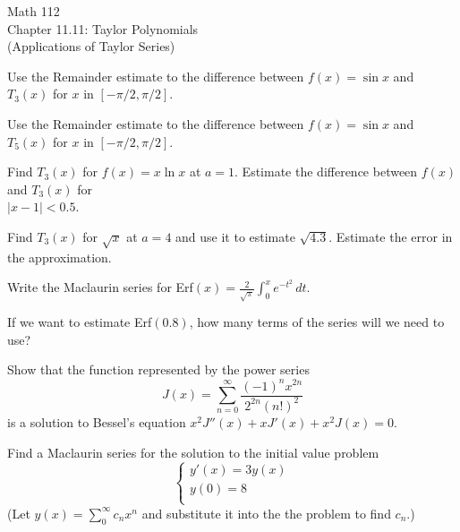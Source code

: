\documentclass[11pt]{article}
\begin{document}
\begin{center}
\Large
\rm{Math 112}
\\
\rm{Chapter 11.11:  Taylor Polynomials\\
  (Applications of Taylor Series)}
\\
\end{center}
\vspace{0.2in}

\vspace{0.2in}

Use the Remainder estimate to the difference between $f(x) = \sin{x}$ and $T_3(x)$ for $x$ in $[-\pi/2,\pi/2]$.

\vspace{2.5in}

Use the Remainder estimate to the difference between $f(x) = \sin{x}$ and $T_5(x)$ for $x$ in $[-\pi/2,\pi/2]$.

\vspace{1.2in}
Find $T_3(x)$ for $f(x) = x\ln{x}$ at $a=1$.  Estimate the difference between $f(x)$ and $T_3(x)$ for \\$|x-1|<0.5$.


\pagebreak
Find $T_3(x)$ for $\sqrt{x}$ at $a=4$ and use it to estimate $\sqrt{4.3}$. Estimate the error in the approximation.\\


\vspace{3.5in}


Write the Maclaurin series for Erf$(x) = \frac{2}{\sqrt{\pi}}\int_0^x e^{-t^2}\, dt$.

\vspace{3in}

If we want to estimate Erf$(0.8)$, how many terms of the series will we need to use?  


\pagebreak
Show that the function represented by the power series 
\begin{displaymath}
J(x) = \sum_{n=0}^{\infty} \frac{(-1)^{n}x^{2n}}{2^{2n}(n!)^2}
\end{displaymath}
is a solution to Bessel's equation $x^2J''(x) + xJ'(x) + x^2J(x) = 0$.\\

\vspace{3.5in}

Find a Maclaurin series for the solution to the initial value problem
\begin{displaymath}
  \left\{ \begin{array}{ll}
y'(x) = 3y(x) \\
y(0) = 8 \\
\end{array} \right.
\end{displaymath}
(Let $y(x) = \sum_0^{\infty}c_nx^n$ and substitute it into the the problem to find $c_n$.)
\end{document}

